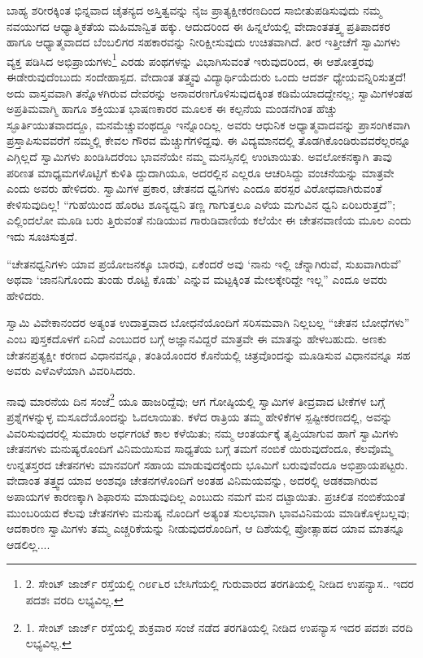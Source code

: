 ಬಾಹ್ಯ ಶರೀರಕ್ಕಿಂತ ಭಿನ್ನವಾದ ಚೈತನ್ಯದ ಅಸ್ತಿತ್ವವನ್ನು ನೈಜ ಪ್ರಾತ್ಯಕ್ಷೀಕರಣದಿಂದ ಸಾಬೀತುಪಡಿಸುವುದು ನಮ್ಮ ನವಯುಗದ ಆಧ್ಯಾತ್ಮಿಕತೆಯ ಮಹಿಮಾನ್ವಿತ ಹಕ್ಕು. ಆದುದರಿಂದ ಈ ಹಿನ್ನಲೆಯಲ್ಲಿ ವೇದಾಂತತತ್ತ್ವ ಪ್ರತಿಪಾದಕರ ಹಾಗೂ ಆಧ್ಯಾತ್ಮವಾದದ ಬೆಂಬಲಿಗರ ಸಹಕಾರವನ್ನು ನೀರಿಕ್ಷೀಸುವುದು ಉಚಿತವಾಗಿದೆ. ತೀರ ಇತ್ತೀಚೆಗೆ ಸ್ವಾಮಿಗಳು ವ್ಯಕ್ತ ಪಡಿಸಿದ ಅಭಿಪ್ರಾಯಗಳು\footnote{2. ಸೇಂಟ್ ಜಾರ್ಜ್ ರಸ್ತೆಯಲ್ಲಿ ೧೮೯೬ರ ಬೇಸಿಗೆಯಲ್ಲಿ ಗುರುವಾರದ ತರಗತಿಯಲ್ಲಿ ನೀಡಿದ ಉಪನ್ಯಾಸ.. ಇದರ ಪದಶಃ ವರದಿ ಲಭ್ಯವಿಲ್ಲ.} ಎರಡು ಪಂಥಗಳನ್ನು ವಿಭಾಗಿಸುವಂತೆ ಇರುವುದರಿಂದ, ಈ ಆಶೋತ್ತರವು ಈಡೇರುವುದೆಂಬುದು ಸಂದೇಹಾಸ್ಪದ. ವೇದಾಂತ ತತ್ತ್ವವು ವಿದ್ಯಾರ್ಥಿಯೆದುರು ಒಂದು ಆದರ್ಶ ಧ್ಯೇಯವನ್ನಿರಿಸುತ್ತದೆ! ಅದು ವಾಸ್ತವವಾಗಿ ತನ್ನೊಳಗಿರುವ ದೇವರನ್ನು ಅನಾವರಣಗೊಳಿಸುವುದಕ್ಕಿಂತ ಕಡಿಮೆಯಾದದ್ದೇನಲ್ಲ; ಸ್ವಾಮಿಗಳಂತಹ ಅಪ್ರತಿಮವಾಗ್ಮಿ ಹಾಗೂ ಶಕ್ತಿಯುತ ಭಾಷಣಕಾರರ ಮೂಲಕ ಈ ಕಲ್ಪನೆಯ ಮಂಡನೆಗಿಂತ ಹೆಚ್ಚು ಸ್ಫೂರ್ತಿಯುತವಾದದ್ದೂ, ಮನಮೆಚ್ಚುವಂಥದ್ದೂ ಇನ್ನೊಂದಿಲ್ಲ. ಅವರು ಆಧುನಿಕ ಅಧ್ಯಾತ್ಮವಾದವನ್ನು ಪ್ರಾಸಂಗಿಕವಾಗಿ ಪ್ರಸ್ತಾಪಿಸುವವರೆಗೆ ನಮ್ಮಲ್ಲಿ ಕೇವಲ ಗೌರವ ಮೆಚ್ಚುಗೆಗಳಿದ್ದವು. ಈ ವಿದ್ಯಮಾನದಲ್ಲಿ ತೊಡಗಿಕೊಂಡಿರುವವರೆಲ್ಲರನ್ನೂ ಎಗ್ಗಿಲ್ಲದೆ ಸ್ವಾಮಿಗಳು ಖಂಡಿಸಿದರೆಂಬ ಭಾವನೆಯೇ ನಮ್ಮ ಮನಸ್ಸಿನಲ್ಲಿ ಉಂಟಾಯಿತು. ಅವಲೋಕನಕ್ಕಾಗಿ ತಾವು ಪರಿಣತ ಮಾಧ್ಯಮಗಳೊಟ್ಟಿಗೆ ಕುಳಿತಿ ದ್ದುದಾಗಿಯೂ, ಅದರಲ್ಲಿನ ಎಲ್ಲರೂ ಆಚರಿಸಿದ್ದು ವಂಚನೆಯನ್ನು ಮಾತ್ರವೇ ಎಂದು ಅವರು ಹೇಳಿದರು. ಸ್ವಾಮಿಗಳ ಪ್ರಕಾರ, ಚೇತನದ ಧ್ವನಿಗಳು ಎಂದೂ ಪರಸ್ಪರ ವಿರೋಧವಾಗಿರುವಂತೆ ಕೇಳಿಸುವುದಿಲ್ಲ! “ಗುಹೆಯಿಂದ ಹೊರಟ ಶೂನ್ಯಧ್ವನಿ ತಣ್ಣ ಗಾಗುತ್ತಲೂ ಎಳೆಯ ಮಗುವಿನ ಧ್ವನಿ ಏರಿಬರುತ್ತದೆ”; ಎಲ್ಲಿಂದಲೋ ಮೂಡಿ ಬರು ತ್ತಿರುವಂತೆ ನುಡಿಯುವ ಗಾರುಡಿವಾಣಿಯ ಕಲೆಯೇ ಈ ಚೇತನವಾಣಿಯ ಮೂಲ ಎಂದು ಇದು ಸೂಚಿಸುತ್ತದೆ.

“ಚೇತನಧ್ವನಿಗಳು ಯಾವ ಪ್ರಯೋಜನಕ್ಕೂ ಬಾರವು, ಏಕೆಂದರೆ ಅವು ‘ನಾನು ಇಲ್ಲಿ ಚೆನ್ನಾಗಿರುವೆ, ಸುಖವಾಗಿರುವೆ’ ಅಥವಾ ‘ಜಾನನಿಗೊಂದು ತುಂಡು ರೊಟ್ಟಿ ಕೊಡು’ ಎನ್ನುವ ಮಟ್ಟಕ್ಕಿಂತ ಮೇಲಕ್ಕೇರಿದ್ದೇ ಇಲ್ಲ” ಎಂದೂ ಅವರು ಹೇಳಿದರು.

ಸ್ವಾಮಿ ವಿವೇಕಾನಂದರ ಅತ್ಯಂತ ಉದಾತ್ತವಾದ ಬೋಧನೆಯೊಂದಿಗೆ ಸರಿಸಮವಾಗಿ ನಿಲ್ಲಬಲ್ಲ “ಚೇತನ ಬೋಧೆಗಳು” ಎಂಬ ಪುಸ್ತಕದೊಳಗೆ ಏನಿದೆ ಎಂಬುದರ ಬಗ್ಗೆ ಅಜ್ಞಾನವಿದ್ದರೆ ಮಾತ್ರವೇ ಈ ಮಾತನ್ನು ಹೇಳಬಹುದು. ಅಣಕು ಚೇತನಪ್ರತ್ಯಕ್ಷೀ ಕರಣದ ವಿಧಾನವನ್ನೂ, ತಂತಿಯೊಂದರ ಕೊನೆಯಲ್ಲಿ ಚಿತ್ರವೊಂದನ್ನು ಮೂಡಿಸುವ ವಿಧಾನವನ್ನೂ ಸಹ ಅವರು ಎಳೆಎಳೆಯಾಗಿ ವಿವರಿಸಿದರು.

ನಾವು ಮಾರನೆಯ ದಿನ ಸಂಜೆ\footnote{1. ಸೇಂಟ್ ಜಾರ್ಜ್ ರಸ್ತೆಯಲ್ಲಿ ಶುಕ್ರವಾರ ಸಂಜೆ ನಡೆದ ತರಗತಿಯಲ್ಲಿ ನೀಡಿದ ಉಪನ್ಯಾಸ ಇದರ ಪದಶಃ ವರದಿ ಲಭ್ಯವಿಲ್ಲ.} ಯೂ ಹಾಜರಿದ್ದೆವು; ಆಗ ಗೋಷ್ಠಿಯಲ್ಲಿ ಸ್ವಾಮಿಗಳ ತೀವ್ರವಾದ ಟೀಕೆಗಳ ಬಗ್ಗೆ ಪ್ರಶ್ನೆಗಳನ್ನುಳ್ಳ ಮಸೂದೆಯೊಂದನ್ನು ಓದಲಾಯಿತು. ಕಳೆದ ರಾತ್ರಿಯ ತಮ್ಮ ಹೇಳಿಕೆಗಳ ಸ್ಪಷ್ಟೀಕರಣದಲ್ಲಿ, ಅವನ್ನು ವಿವರಿಸುವುದರಲ್ಲಿ ಸುಮಾರು ಅರ್ಧಗಂಟೆ ಕಾಲ ಕಳೆಯಿತು; ನಮ್ಮ ಆಂತರ್ಯಕ್ಕೆ ತೃಪ್ತಿಯಾಗುವ ಹಾಗೆ ಸ್ವಾಮಿಗಳು ಚೇತನಗಳು ಮನುಷ್ಯರೊಂದಿಗೆ ವಿನಿಮಯಿಸುವ ಸಾಧ್ಯತೆಯ ಬಗ್ಗೆ ತಮಗೆ ನಂಬಿಕೆ ಯಿರುವುದೆಂದೂ, ಕೆಲವೊಮ್ಮೆ ಉನ್ನತಸ್ತರದ ಚೇತನಗಳು ಮಾನವರಿಗೆ ಸಹಾಯ ಮಾಡುವುದಕ್ಕೆಂದು ಭೂಮಿಗೆ ಬರುವುವೆಂದೂ ಅಭಿಪ್ರಾಯಪಟ್ಟರು. ವೇದಾಂತ ತತ್ತ್ವದ ಯಾವ ಅಂಶವೂ ಚೇತನಗಳೊಂದಿಗೆ ಅಂತಹ ವಿನಿಮಯವನ್ನು, ಅದರಲ್ಲಿ ಅಡಕವಾಗಿರುವ ಅಪಾಯಗಳ ಕಾರಣಕ್ಕಾಗಿ ಶಿಫಾರಸು ಮಾಡುವುದಿಲ್ಲ ಎಂಬುದು ನಮಗೆ ಮನ ದಟ್ಟಾಯಿತು. ಪ್ರಚಲಿತ ನಂಬಿಕೆಯಂತೆ ಮುಂಬರಿಯದ ಕೆಲವು ಚೇತನಗಳು ಮನುಷ್ಯ ನೊಂದಿಗೆ ಅತ್ಯಂತ ಸುಲಭವಾಗಿ ಭಾವವಿನಿಮಯ ಮಾಡಿಕೊಳ್ಳಬಲ್ಲವು; ಆದಕಾರಣ ಸ್ವಾಮಿಗಳು ತಮ್ಮ ಎಚ್ಚರಿಕೆಯನ್ನು ನೀಡುವುದರೊಂದಿಗೆ, ಆ ದಿಶೆಯಲ್ಲಿ ಪ್ರೋತ್ಸಾಹದ ಯಾವ ಮಾತನ್ನೂ ಆಡಲಿಲ್ಲ....

